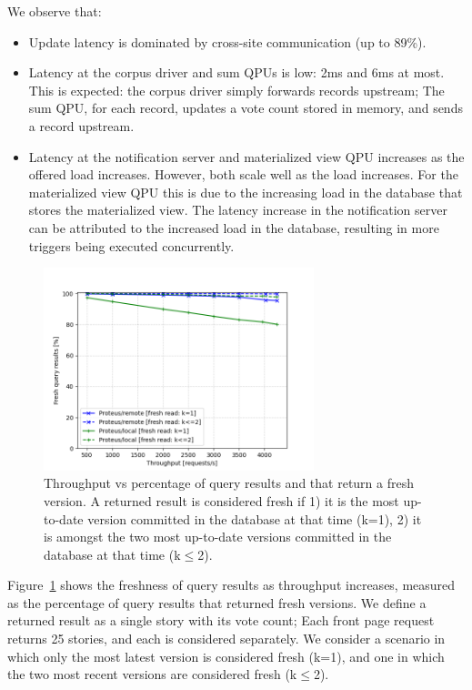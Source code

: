 We observe that:
\begin{itemize}
  \item Update latency is dominated by cross-site communication  (up to 89\%).
  \item Latency at the corpus driver and sum QPUs is low: 2ms and 6ms at most.
  This is expected: the corpus driver simply forwards records upstream;
  The sum QPU, for each record, updates a vote count stored in memory, and sends a record upstream.
  \item Latency at the notification server and materialized view QPU increases as the offered load increases.
  However, both scale well as the load increases.
  For the materialized view QPU this is due to the increasing load in the database that stores the materialized view.
  The latency increase in the notification server can be attributed to the increased load in the database,
  resulting in more triggers being executed concurrently.
\end{itemize}

\begin{figure}[H]
\centering
  \includegraphics[width=0.7\textwidth]{./figures/evaluation/fresh_reads_throughput.png}
  \caption{Throughput vs percentage of query results and that return a fresh version.
  A returned result is considered fresh if 1) it is the most up-to-date version committed in the database at that time (k=1),
  2) it is amongst the two most up-to-date versions committed in the database at that time (k$\leq$2).}
  \label{fig:fresh_reads_throughput}
\end{figure}

\bigskip
\noindent
Figure~\ref{fig:fresh_reads_throughput} shows the freshness of query results as throughput increases,
measured as the percentage of query results that returned fresh versions.
We define a returned result as a single story with its vote count;
Each front page request returns 25 stories, and each is considered separately.
We consider a scenario in which only the most latest version is considered fresh (k=1),
and one in which the two most recent versions are considered fresh (k$\leq$2).

